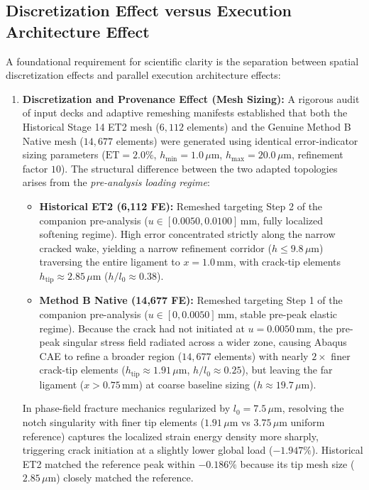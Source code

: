 \subsection{Discretization Effect versus Execution Architecture Effect}
\label{subsec:gate6b_discretization_vs_execution}

A foundational requirement for scientific clarity is the separation between spatial discretization effects and parallel execution architecture effects:
\begin{enumerate}
  \item \textbf{Discretization and Provenance Effect (Mesh Sizing):} 
  A rigorous audit of input decks and adaptive remeshing manifests established that both the Historical Stage 14 ET2 mesh ($6{,}112$ elements) and the Genuine Method B Native mesh ($14{,}677$ elements) were generated using identical error-indicator sizing parameters ($\mathrm{ET} = 2.0\%$, $h_{\min} = 1.0\,\mu\mathrm{m}$, $h_{\max} = 20.0\,\mu\mathrm{m}$, refinement factor $10$). The structural difference between the two adapted topologies arises from the \emph{pre-analysis loading regime}:
  \begin{itemize}
    \item \textbf{Historical ET2 (6,112 FE):} Remeshed targeting Step 2 of the companion pre-analysis ($u \in [0.0050, 0.0100]\,\mathrm{mm}$, fully localized softening regime). High error concentrated strictly along the narrow cracked wake, yielding a narrow refinement corridor ($h \le 9.8\,\mu\mathrm{m}$) traversing the entire ligament to $x = 1.0\,\mathrm{mm}$, with crack-tip elements $h_{\mathrm{tip}} \approx 2.85\,\mu\mathrm{m}$ ($h/l_0 \approx 0.38$).
    \item \textbf{Method B Native (14,677 FE):} Remeshed targeting Step 1 of the companion pre-analysis ($u \in [0, 0.0050]\,\mathrm{mm}$, stable pre-peak elastic regime). Because the crack had not initiated at $u = 0.0050\,\mathrm{mm}$, the pre-peak singular stress field radiated across a wider zone, causing Abaqus CAE to refine a broader region ($14{,}677$ elements) with nearly $2\times$ finer crack-tip elements ($h_{\mathrm{tip}} \approx 1.91\,\mu\mathrm{m}$, $h/l_0 \approx 0.25$), but leaving the far ligament ($x > 0.75\,\mathrm{mm}$) at coarse baseline sizing ($h \approx 19.7\,\mu\mathrm{m}$).
  \end{itemize}
  In phase-field fracture mechanics regularized by $l_0 = 7.5\,\mu\mathrm{m}$, resolving the notch singularity with finer tip elements ($1.91\,\mu\mathrm{m}$ vs $3.75\,\mu\mathrm{m}$ uniform reference) captures the localized strain energy density more sharply, triggering crack initiation at a slightly lower global load ($-1.947\%$). Historical ET2 matched the reference peak within $-0.186\%$ because its tip mesh size ($2.85\,\mu\mathrm{m}$) closely matched the reference.

\end{enumerate}
